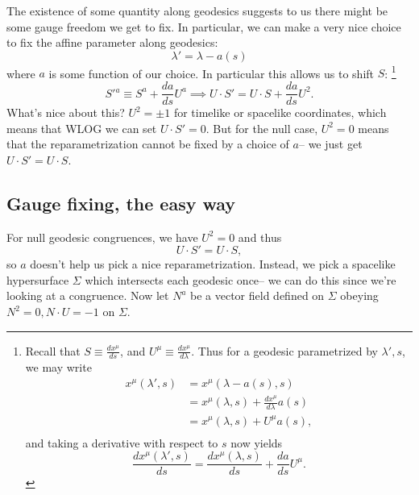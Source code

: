 The existence of some quantity along geodesics suggests to us there might be some gauge freedom we get to fix. In particular, we can make a very nice choice to fix the affine parameter along geodesics:
\begin{equation}
    \lambda'=\lambda - a(s)
\end{equation}
where $a$ is some function of our choice. In particular this allows us to shift $S$:%
    \footnote{Recall that $S\equiv \frac{dx^\mu}{ds}$, and $U^\mu\equiv\frac{dx^\mu}{d\lambda}$. Thus for a geodesic parametrized by $\lambda',s$, we may write
    \begin{align*}
        x^\mu(\lambda',s) &= x^\mu(\lambda-a(s),s)\\
            &= x^\mu(\lambda,s)+\frac{dx^\mu}{d\lambda}a(s)\\
            &= x^\mu(\lambda,s)+U^\mu a(s),\\
    \end{align*}
    and taking a derivative with respect to $s$ now yields
    \begin{equation*}
        \frac{dx^\mu(\lambda',s)}{ds} = \frac{dx^\mu(\lambda,s)}{ds}+\frac{da}{ds}U^\mu.
    \end{equation*}
    }
\begin{equation}
    S'{}^a\equiv S^a +\frac{da}{ds} U^a \implies U\cdot S'=U\cdot S +\frac{da}{ds}U^2.
\end{equation}
What's nice about this? $U^2=\pm 1$ for timelike or spacelike coordinates, which means that WLOG we can set $U\cdot S'=0$. But for the null case, $U^2=0$ means that the reparametrization cannot be fixed by a choice of $a$-- we just get $U\cdot S'=U\cdot S$.

\subsection*{Gauge fixing, the easy way}
For null geodesic congruences, we have $U^2=0$ and thus
\begin{equation*}
    U\cdot S'= U\cdot S,
\end{equation*}
so $a$ doesn't help us pick a nice reparametrization. Instead, we pick a spacelike hypersurface $\Sigma$ which intersects each geodesic once-- we can do this since we're looking at a congruence. Now let $N^a$ be a vector field defined on $\Sigma$ obeying $N^2=0, N\cdot U=-1$ on $\Sigma$.


